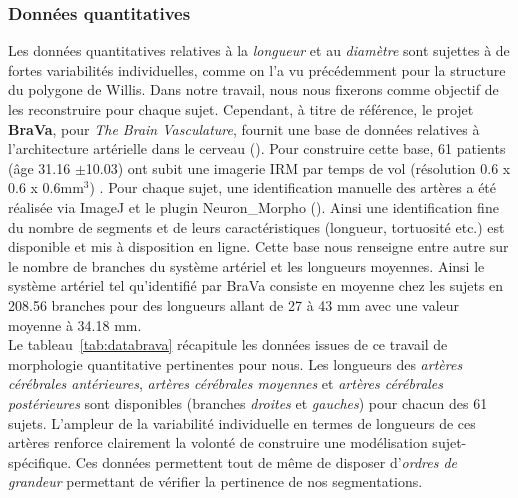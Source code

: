 \subsubsection{Données quantitatives}
Les données quantitatives relatives à la {\em longueur} et au {\em diamètre} sont sujettes à de fortes variabilités individuelles, comme on l'a vu précédemment pour la structure du polygone de Willis. Dans notre travail, nous nous fixerons comme objectif de les reconstruire pour chaque sujet. Cependant, à titre de référence, le projet {\bf BraVa}, pour {\em The Brain Vasculature}, fournit une base de données relatives à l'architecture artérielle dans le cerveau (\cite{Wright2013}). Pour construire cette base, 61 patients (âge 31.16 $\pm$10.03) ont subit une imagerie IRM par temps de vol (résolution 0.6 x 0.6 x 0.6mm$^3$) . Pour chaque sujet, une identification manuelle des artères a été réalisée via ImageJ et le plugin Neuron\_Morpho (\cite{neuronmorpho}). Ainsi une identification fine du nombre de segments et de leurs caractéristiques (longueur, tortuosité etc.) est disponible et mis à disposition en ligne. Cette base nous renseigne entre autre sur le nombre de branches du système artériel et les longueurs moyennes. Ainsi le système artériel tel qu'identifié par BraVa consiste en moyenne chez les sujets en 208.56 branches pour des longueurs allant de 27 à 43 mm avec une valeur moyenne à 34.18 mm.\\
Le tableau~\ref{tab:databrava} récapitule les données issues de ce travail de morphologie quantitative pertinentes pour nous. Les longueurs des {\em artères cérébrales antérieures}, {\em artères cérébrales moyennes} et {\em artères cérébrales postérieures} sont disponibles (branches {\em droites} et {\em gauches}) pour chacun des 61 sujets. L'ampleur de la variabilité individuelle en termes de longueurs de ces artères renforce clairement la volonté de construire une modélisation sujet-spécifique. Ces données permettent tout de même de disposer d'{\em ordres de grandeur} permettant de vérifier la pertinence de nos segmentations.
